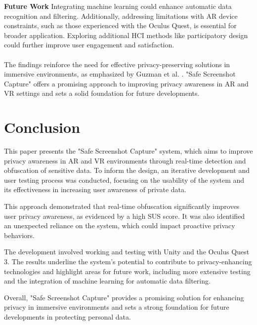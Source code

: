 \documentclass[sigconf,authordraft]{acmart}
\begin{document}
\textbf{Future Work} Integrating machine learning could enhance automatic data recognition and filtering. Additionally, addressing limitations with AR device constraints, such as those experienced with the Oculus Quest, is essential for broader application. Exploring additional HCI methods like participatory design could further improve user engagement and satisfaction.\\
\\
The findings reinforce the need for effective privacy-preserving solutions in immersive environments, as emphasized by Guzman et al. \cite{guzman2023privacy}. "Safe Screenshot Capture" offers a promising approach to improving privacy awareness in AR and VR settings and sets a solid foundation for future developments.

\section{\textbf{Conclusion}}

This paper presents the "Safe Screenshot Capture" system, which aims to improve privacy awareness in AR and VR environments through real-time detection and obfuscation of sensitive data. To inform the design, an iterative development and user testing process was conducted, focusing on the usability of the system and its effectiveness in increasing user awareness of private data.

This approach demonstrated that real-time obfuscation significantly improves user privacy awareness, as evidenced by a high SUS score. It was also identified an unexpected reliance on the system, which could impact proactive privacy behaviors.

The development involved working and testing with Unity and the Oculus Quest 3. The results underline the system's potential to contribute to privacy-enhancing technologies and highlight areas for future work, including more extensive testing and the integration of machine learning for automatic data filtering.

Overall, "Safe Screenshot Capture" provides a promising solution for enhancing privacy in immersive environments and sets a strong foundation for future developments in protecting personal data.
\end{document}
